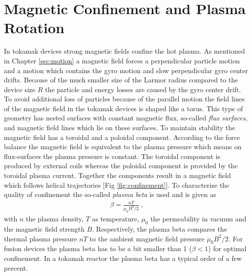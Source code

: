 \newpage
\section{Magnetic Confinement and Plasma Rotation}
\label{sec:confinement}

In tokamak devices strong magnetic fields confine the hot plasma. As mentioned in Chapter \ref{sec:motion} a magnetic field forces a perpendicular particle motion and a motion which contains the gyro motion and slow perpendicular gyro center drifts. Because of the much smaller size of the Larmor radius compared to the device size $R$ the particle and energy losses are caused by the gyro center drift. To avoid additional loss of particles because of the parallel motion the field lines of the magnetic field in the tokamak devices is shaped like a torus. This type of geometry has nested surfaces with constant magnetic flux, so-called \textit{flux surfaces}, and magnetic field lines which lie on these surfaces. To maintain stability the magnetic field has a toroidal and a poloidal component. According to the force balance the magnetic field is equivalent to the plasma pressure which means on flux-surfaces the plasma pressure is constant. \cite{Stroth2011, Wesson2011} The toroidal component is produced by external coils whereas the poloidal component is provided by the toroidal plasma current. Together the components result in a magnetic field which follows helical trajectories [Fig \ref{fig:confinement}]. To characterize the quality of confinement the so-called \textit{plasma beta} is used and is given as
\begin{gather}
    \beta = \frac{nT}{\mu_0 B^2/2}~,
\end{gather} 
with $n$ the plasma density, $T$ as temperature, $\mu_0$ the permeability in vacuum and the magnetic field strength $B$. Respectively, the plasma beta compares the thermal plasma pressure $nT$ to the ambient magnetic field pressure $\mu_0 B^2/2$. For fusion devices the plasma beta has to be a bit smaller than 1 ($\beta < 1$) for optimal confinement. In a tokamak reactor the plasma beta has a typical order of a few percent. \cite{Wesson2011}

